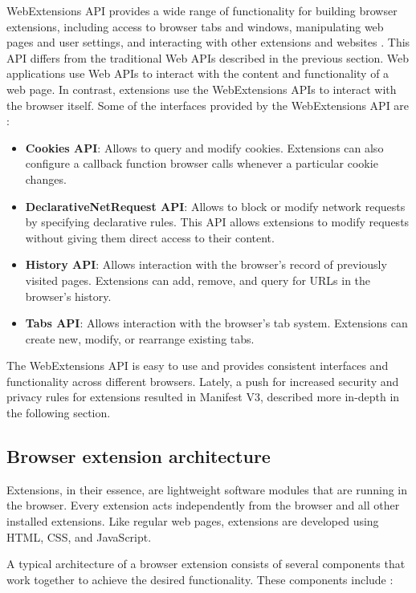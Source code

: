 WebExtensions API provides a wide range of functionality for building browser extensions, including access to browser tabs and windows, manipulating web pages and user settings, and interacting with other extensions and websites \cite{ChromeWebExtensions}. This API differs from the traditional Web APIs described in the previous section. Web applications use Web APIs to interact with the content and functionality of a web page. In contrast, extensions use the WebExtensions APIs to interact with the browser itself. Some of the interfaces provided by the WebExtensions API are \cite{ChromeWebExtensions}:

\begin{itemize}
	\item \textbf{Cookies API}: Allows to query and modify cookies. Extensions can also configure a callback function browser calls whenever a particular cookie changes.
	\item \textbf{DeclarativeNetRequest API}: Allows to block or modify network requests by specifying declarative rules. This API allows extensions to modify requests without giving them direct access to their content.
	\item \textbf{History API}: Allows interaction with the browser's record of previously visited pages. Extensions can add, remove, and query for URLs in the browser's history.
	\item \textbf{Tabs API}: Allows interaction with the browser's tab system. Extensions can create new, modify, or rearrange existing tabs.
\end{itemize}

The WebExtensions API is easy to use and provides consistent interfaces and functionality across different browsers. Lately, a push for increased security and privacy rules for extensions resulted in Manifest V3, described more in-depth in the following section.

\subsection{Browser extension architecture}

Extensions, in their essence, are lightweight software modules that are running in the browser. Every extension acts independently from the browser and all other installed extensions. Like regular web pages, extensions are developed using HTML, CSS, and JavaScript.

A typical architecture of a browser extension consists of several components that work together to achieve the desired functionality. These components include \cite{ChromeWebExtensions}:

